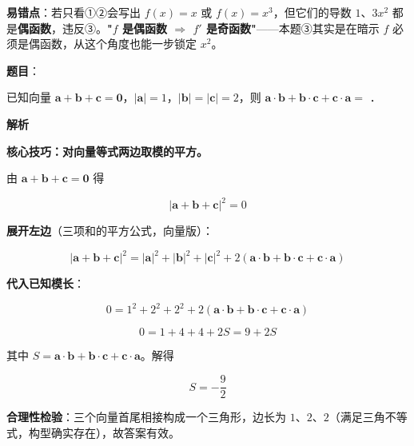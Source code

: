\begin{answer}
\begin{gktip}
\textbf{易错点}：若只看①②会写出 $f(x)=x$ 或 $f(x)=x^{3}$，但它们的导数 $1$、$3x^{2}$ 都是\textbf{偶函数}，违反③。\textbf{"$f$ 是偶函数 $\Rightarrow$ $f'$ 是奇函数"}——本题③其实是在暗示 $f$ 必须是偶函数，从这个角度也能一步锁定 $x^{2}$。
\end{gktip}


\par\medskip

\end{answer}
\begin{answer}

\textbf{题目}：

已知向量 $\boldsymbol a+\boldsymbol b+\boldsymbol c=\boldsymbol 0$，$|\boldsymbol a|=1$，$|\boldsymbol b|=|\boldsymbol c|=2$，则 $\boldsymbol a\cdot\boldsymbol b+\boldsymbol b\cdot\boldsymbol c+\boldsymbol c\cdot\boldsymbol a=$ \gkblank{}．

\textbf{解析}

\textbf{核心技巧：对向量等式两边取模的平方。}

由 $\boldsymbol a+\boldsymbol b+\boldsymbol c=\boldsymbol 0$ 得

\nopagebreak[4]
\[|\boldsymbol a+\boldsymbol b+\boldsymbol c|^{2}=0\]

\textbf{展开左边}（三项和的平方公式，向量版）：

\nopagebreak[4]
\[|\boldsymbol a+\boldsymbol b+\boldsymbol c|^{2}=|\boldsymbol a|^{2}+|\boldsymbol b|^{2}+|\boldsymbol c|^{2}+2\left(\boldsymbol a\cdot\boldsymbol b+\boldsymbol b\cdot\boldsymbol c+\boldsymbol c\cdot\boldsymbol a\right)\]

\textbf{代入已知模长}：

\nopagebreak[4]
\[0=1^{2}+2^{2}+2^{2}+2\left(\boldsymbol a\cdot\boldsymbol b+\boldsymbol b\cdot\boldsymbol c+\boldsymbol c\cdot\boldsymbol a\right)\]

\nopagebreak[4]
\[0=1+4+4+2S=9+2S\]

其中 $S=\boldsymbol a\cdot\boldsymbol b+\boldsymbol b\cdot\boldsymbol c+\boldsymbol c\cdot\boldsymbol a$。解得

\nopagebreak[4]
\[S=-\frac92\]

\begin{gktip}
\textbf{合理性检验}：三个向量首尾相接构成一个三角形，边长为 $1$、$2$、$2$（满足三角不等式，构型确实存在），故答案有效。


\end{gktip}
\end{answer}
